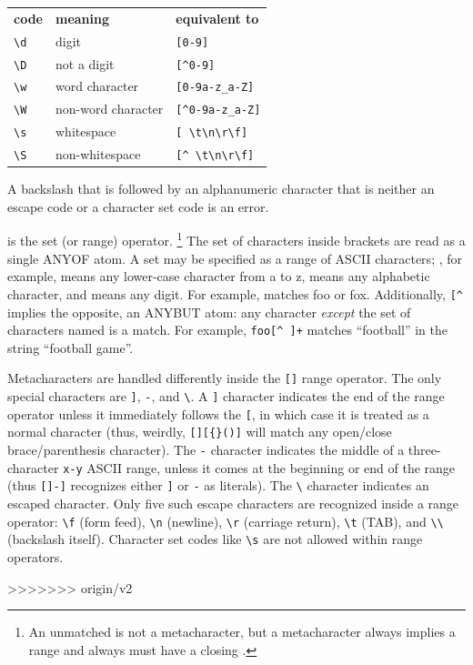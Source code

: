 \begin{center}
\begin{tabular}{lll} 
\textbf{code} & \textbf{meaning}    & \textbf{equivalent to} \\
 \verb+\d+    & digit               & \verb+[0-9]+ \\
 \verb+\D+    & not a digit         & \verb+[^0-9]+ \\
 \verb+\w+    & word character      & \verb+[0-9a-z_a-Z]+ \\
 \verb+\W+    & non-word character  & \verb+[^0-9a-z_a-Z]+ \\
 \verb+\s+    & whitespace          & \verb+[ \t\n\r\f]+ \\
 \verb+\S+    & non-whitespace      & \verb+[^ \t\n\r\f]+ \\
\end{tabular}
\end{center}

A backslash that is followed by an alphanumeric character that is neither
an escape code or a character set code is an error.

\ccode{[} is the set (or range) operator. \footnote{An unmatched
\ccode{]} is not a metacharacter, but a \ccode{[} metacharacter always
implies a range and always must have a closing \ccode{]}.} The set of
characters inside brackets \ccode{[]} are read as a single ANYOF
atom. A set may be specified as a range of ASCII characters;
\ccode{[a-z]}, for example, means any lower-case character from a to
z, \ccode{[a-zA-Z]} means any alphabetic character, and \ccode{[0-9]}
means any digit. For example,  matches foo or
fox. Additionally, \verb+[^+ implies the opposite, an ANYBUT atom: any
character \emph{except} the set of characters named is a match. For
example, \verb'foo[^ ]+' matches ``football'' in the string ``football
game''. 

Metacharacters are handled differently inside the \verb+[]+ range
operator. The only special characters are \verb+]+, \verb+-+, and
\verb+\+. A \verb+]+ character indicates the end of the range operator
unless it immediately follows the \verb+[+, in which case it is
treated as a normal character (thus, weirdly, \verb+[][{}()]+ will
match any open/close brace/parenthesis character). The \verb+-+
character indicates the middle of a three-character \verb+x-y+ ASCII
range, unless it comes at the beginning or end of the range (thus
\verb+[]-]+ recognizes either \verb+]+ or \verb+-+ as literals).  The
\verb+\+ character indicates an escaped character. Only five such
escape characters are recognized inside a range operator: \verb+\f+
(form feed), \verb+\n+ (newline), \verb+\r+ (carriage return),
\verb+\t+ (TAB), and \verb+\\+ (backslash itself). Character set codes
like \verb+\s+ are not allowed within range operators.








>>>>>>> origin/v2
